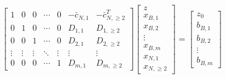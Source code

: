 \documentclass[border=3pt,math]{standalone}
\begin{document}
{
\renewcommand{\arraystretch}{2.0}
\setlength{\arraycolsep}{7pt}

    \[
        \left[ \begin{array}{c|cccc|cc}
            1       & 0         & 0         & \cdots    & 0         & - \bar{c}_{N, 1}  & -\bar{c}_{N, \geq 2}^T    \\
            \hline
            0       & 1         & 0         & \cdots    & 0         & D_{1, 1}         & D_{1, \geq 2}  \\
            0       & 0         & 1         & \cdots    & 0         & D_{2, 1}         & D_{2, \geq 2}  \\
            \vdots  & \vdots    & \vdots    & \ddots    & \vdots    & \vdots    & \vdots                \\
            0       & 0         & 0         & \cdots    & 1         & D_{m, 1}         & D_{m, \geq 2} 
        \end{array} \right]
        \left[ \begin{array}{c}
            z           \\
            \hline
            x_{B, 1}    \\
            x_{B, 2}    \\
            \vdots      \\
            x_{B, m}    \\
            \hline
            x_{N, 1}    \\
            x_{N, \geq 2}
        \end{array} \right]
        =
        \left[ \begin{array}{c}
            z_0         \\
            \hline
            b_{B, 1}    \\
            b_{B, 2}    \\
            \vdots      \\
            b_{B, m}
        \end{array} \right]
    \]
}
\end{document}
